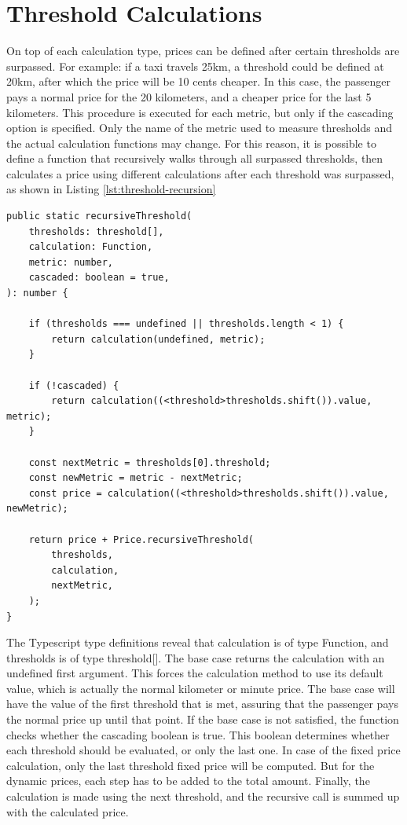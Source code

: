 \section{Threshold Calculations}
On top of each calculation type, prices can be defined after certain thresholds are surpassed. For example: if a taxi travels 25km, a threshold could be defined at 20km, after which the price will be 10 cents cheaper. In this case, the passenger pays a normal price for the 20 kilometers, and a cheaper price for the last 5 kilometers. This procedure is executed for each metric, but only if the cascading option is specified.  Only the name of the metric used to measure thresholds and the actual calculation functions may change. For this reason, it is possible to define a function that recursively walks through all surpassed thresholds, then calculates a price using different calculations after each threshold was surpassed, as shown in Listing \ref{lst:threshold-recursion}

\begin{minipage}{\linewidth}
\begin{lstlisting}[caption={Recursive threshold calculation.}, label={lst:threshold-recursion}]
public static recursiveThreshold(
	thresholds: threshold[],
	calculation: Function,
	metric: number,
	cascaded: boolean = true,
): number {

	if (thresholds === undefined || thresholds.length < 1) {
		return calculation(undefined, metric);
	}

	if (!cascaded) {
		return calculation((<threshold>thresholds.shift()).value, metric);
	}

	const nextMetric = thresholds[0].threshold;
	const newMetric = metric - nextMetric;
	const price = calculation((<threshold>thresholds.shift()).value, newMetric);

	return price + Price.recursiveThreshold(
		thresholds,
		calculation,
		nextMetric,
	);
}
\end{lstlisting}
\end{minipage}

The Typescript type definitions reveal that calculation is of type Function, and thresholds is of type threshold[]. The base case returns the calculation with an undefined first argument. This forces the calculation method to use its default value, which is actually the normal kilometer or minute price. The base case will have the value of the first threshold that is met, assuring that the passenger pays the normal price up until that point. If the base case is not satisfied, the function checks whether the cascading boolean is true. This boolean determines whether each threshold should be evaluated, or only the last one. In case of the fixed price calculation, only the last threshold fixed price will be computed. But for the dynamic prices, each step has to be added to the total amount. Finally, the calculation is made using the next threshold,  and the recursive call is summed up with the calculated price.

